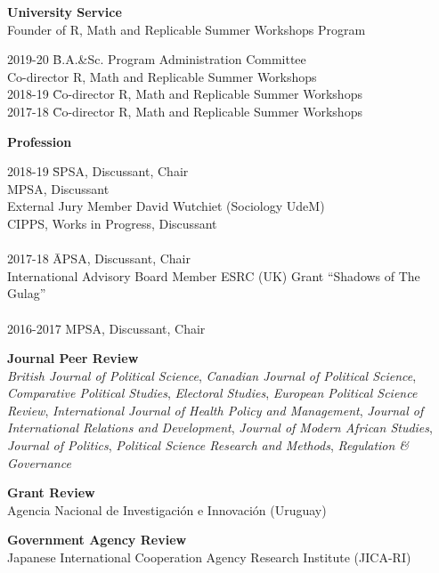 \documentclass[margin,line]{res}
\begin{document}
{\begin{resume}
\textbf{University Service}\\
Founder of R, Math and Replicable Summer Workshops Program

\begin{tabbing}
2019-20 \= B.A.\&Sc. Program Administration Committee \\
\> Co-director  R, Math and Replicable Summer Workshops \\
2018-19 \=  Co-director  R, Math and Replicable Summer Workshops\\
2017-18 \=  Co-director  R, Math and Replicable Summer Workshops
\end{tabbing}


\textbf{Profession}\\
\vspace{-3em}

\begin{tabbing}
2018-19 \=  SPSA, Discussant, Chair\\
\> MPSA, Discussant \\
\> External Jury Member David Wutchiet (Sociology UdeM) \\
\> CIPPS, Works in Progress, Discussant\\
\\
2017-18 \=  APSA, Discussant, Chair\\
\> International Advisory Board Member ESRC (UK) Grant ``Shadows of
The Gulag''\\
\\
2016-2017 MPSA, Discussant, Chair \\
\end{tabbing}
\vspace{-2em}

\textbf{Journal Peer Review}\\
\emph{British Journal of Political Science},
\emph{Canadian Journal
  of Political Science},
\emph{Comparative Political Studies},
\emph{Electoral Studies},
\emph{European Political Science Review},
\emph{International Journal of Health Policy and Management},
\emph{Journal of International Relations and Development},
\emph{Journal of Modern African Studies},
\emph{Journal of Politics},
\emph{Political Science Research and Methods},
\emph{Regulation \& Governance}\par\smallskip

\textbf{Grant Review}\\
Agencia Nacional de Investigaci\'on e Innovaci\'on (Uruguay)

\textbf{Government Agency Review}\\
Japanese International Cooperation Agency Research Institute (JICA-RI)



\end{resume}}
\end{document}
